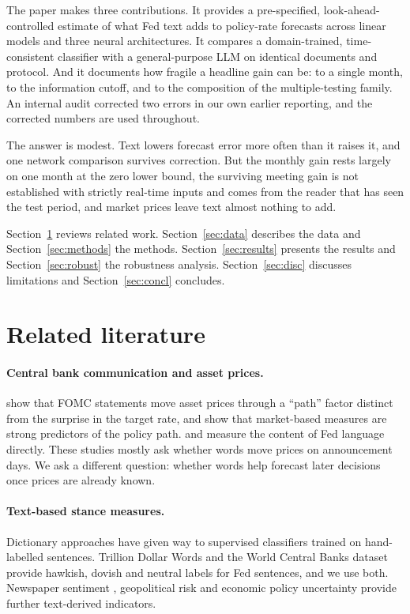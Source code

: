 \documentclass[11pt]{article}
\begin{document}
The paper makes three contributions. It provides a pre-specified, look-ahead-controlled estimate of what Fed text
adds to policy-rate forecasts across linear models and three neural architectures. It compares a domain-trained,
time-consistent classifier with a general-purpose LLM on identical documents and protocol. And it documents how
fragile a headline gain can be: to a single month, to the information cutoff, and to the composition of the
multiple-testing family. An internal audit corrected two errors in our own earlier reporting, and the corrected
numbers are used throughout.

The answer is modest. Text lowers forecast error more often than it raises it, and one network comparison survives
correction. But the monthly gain rests largely on one month at the zero lower bound, the surviving meeting gain is
not established with strictly real-time inputs and comes from the reader that has seen the test period, and market
prices leave text almost nothing to add.

Section~\ref{sec:lit} reviews related work. Section~\ref{sec:data} describes the data and
Section~\ref{sec:methods} the methods. Section~\ref{sec:results} presents the results and
Section~\ref{sec:robust} the robustness analysis. Section~\ref{sec:disc} discusses limitations and
Section~\ref{sec:concl} concludes.

\section{Related literature}\label{sec:lit}

\paragraph{Central bank communication and asset prices.}
\citet{gss2005} show that FOMC statements move asset prices through a ``path'' factor distinct from the
surprise in the target rate, and \citet{gss2007} show that market-based measures are strong predictors of the
policy path. \citet{lucca2009} and \citet{hansen2016} measure the content of Fed language directly. These studies
mostly ask whether words move prices on announcement days. We ask a different question: whether words help
forecast later decisions once prices are already known.

\paragraph{Text-based stance measures.}
Dictionary approaches \citep{loughran2011} have given way to supervised classifiers trained on hand-labelled
sentences. Trillion Dollar Words \citep{shah2023} and the World Central Banks dataset \citep{shah2025} provide
hawkish, dovish and neutral labels for Fed sentences, and we use both. Newspaper sentiment \citep{shapiro2022},
geopolitical risk \citep{caldara2022} and economic policy uncertainty \citep{baker2016} provide further
text-derived indicators.
\end{document}
